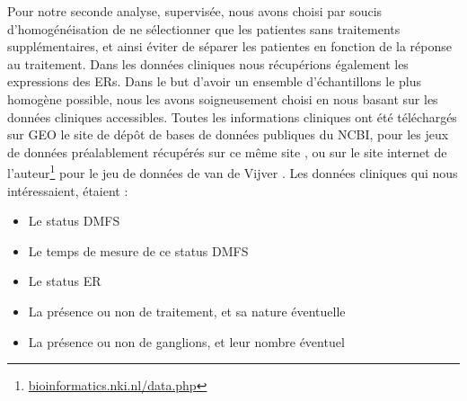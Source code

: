 			\pagebreak
			Pour notre seconde analyse, supervisée, nous avons choisi par soucis d'homogénéisation de ne sélectionner que les patientes sans traitements supplémentaires, et ainsi éviter de séparer les patientes en fonction de la réponse au traitement.
			Dans les données cliniques nous récupérions également les expressions des \aclp{ER}.
			Dans le but d'avoir un ensemble d'échantillons le plus homogène possible, nous les avons soigneusement choisi en nous basant sur les données cliniques accessibles.
			Toutes les informations cliniques ont été téléchargés sur \acs{GEO} le site de dépôt de bases de données publiques du \acs{NCBI}, pour les jeux de données préalablement récupérés sur ce même site \citep{Desmedt2008, Loi2008, Sabatier2011, Schmidt2008, Wang2005}, ou sur le site internet de l'auteur\footnote{\url{bioinformatics.nki.nl/data.php}} pour le jeu de données de van de Vijver \citep{vandevijver2002}.
			Les données cliniques qui nous intéressaient, étaient :
			\begin{itemize}
				\item Le status \acs{DMFS}
				\item Le temps de mesure de ce status \acs{DMFS}
				\item Le status \acs{ER}
				\item La présence ou non de traitement, et sa nature éventuelle
				\item La présence ou non de ganglions, et leur nombre éventuel
			\end{itemize}

